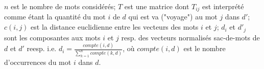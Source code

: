 \begin{itemize}
	$n$ est le nombre de mots considérés; $T$ est une matrice dont $T_{ij}$ est interprété comme étant la quantité du mot $i$ de $d$ qui est va ("voyage") au mot $j$ dans $d'$; $c(i,j)$ est la distance euclidienne entre les vecteurs des mots $i$ et $j$; $d_i$ et $d'_j$ sont les composantes aux mots $i$ et $j$ resp. des vecteurs normalisés sac-de-mots de $d$ et $d'$ reesp. i.e. $d_i = \frac{compte(i, d)}{\sum\limits_{k=1}^n compte(k, d)}$, où $compte(i, d)$ est le nombre d'occurrences du mot $i$ dans $d$.
	
\end{itemize}


 

